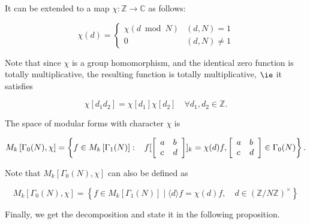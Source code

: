 \begin{remark}
    It can be extended to a map $\chi: \mathbb{Z} \rightarrow \mathbb{C}$ as follows:

$$
\chi(d)= \begin{cases}\chi(d \bmod N) & (d, N)=1 \\ 0 & (d, N) \neq 1\end{cases}
$$

Note that since $\chi$ is a group homomorphism, and the identical zero function is totally multiplicative, the resulting function is totally multiplicative, $\ie$ it satisfies

$$
\chi\left[d_{1} d_{2}\right]=\chi\left[d_{1}\right] \chi\left[d_{2}\right] \quad \forall d_{1}, d_{2} \in \mathbb{Z} .
$$

\end{remark}
\begin{definition}
    The space of modular forms with character $\chi$ is

$$
M_{k}\left[\Gamma_{0}(N), \chi\right]=\left\{f \in M_{k}\left[\Gamma_{1}(N)\right]: \hspace{0.3cm}f[\left[\begin{array}{ll}
a & b \\
c & d
\end{array}\right]]_{k}=\chi(d) f,\left[\begin{array}{ll}
a & b \\
c & d
\end{array}\right] \in \Gamma_{0}(N)\right\} .
$$

\end{definition}
Note that $M_{k}\left[\Gamma_{0}(N), \chi\right]$ can also be defined as

$$
M_{k}\left[\Gamma_{0}(N), \chi\right]=\left\{f \in M_{k}\left[\Gamma_{1}(N)\right] \mid\langle d\rangle f=\chi(d) f, \quad d \in(\mathbb{Z} / N \mathbb{Z})^{\times}\right\}
$$

Finally, we get the decomposition and state it in the following proposition. 

